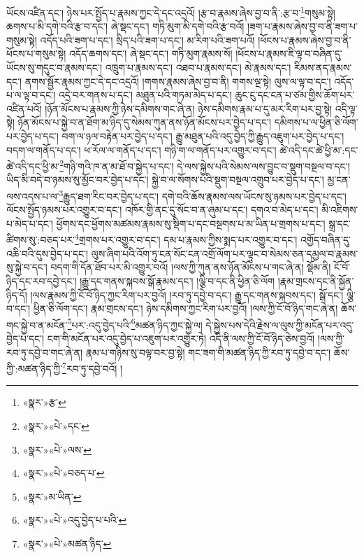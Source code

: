 ཡོངས་འཛིན་དང་། ཉེས་པར་སྤྱོད་པ་རྣམས་ཀྱང་དེ་དང་འདྲའོ། །རྩ་བ་རྣམས་ཞེས་བྱ་བ་ནི་:རྩ་བ་\footnote{«སྣར་»རྩ་}གསུམ་སྟེ། ཆགས་པ་མི་དགེ་བའི་རྩ་བ་དང་། ཞེ་སྡང་དང་། གཏི་མུག་མི་དགེ་བའི་རྩ་བའོ། །ཟག་པ་རྣམས་ཞེས་བྱ་བ་ནི་ཟག་པ་གསུམ་སྟེ། འདོད་པའི་ཟག་པ་དང་། སྲིད་པའི་ཟག་པ་དང་། མ་རིག་པའི་ཟག་པའོ། །ཕོངས་པ་རྣམས་ཞེས་བྱ་བ་ནི་ཕོངས་པ་གསུམ་སྟེ། འདོད་ཆགས་དང་། ཞེ་སྡང་དང་། གཏི་མུག་རྣམས་སོ། །ཕོངས་པ་རྣམས་ཇི་ལྟ་བ་བཞིན་དུ་ཡོངས་སུ་གདུང་བ་རྣམས་དང་། འཁྲུག་པ་རྣམས་དང་། འཐབ་པ་རྣམས་དང་། མེ་རྣམས་དང་། རིམས་ནད་རྣམས་དང་། ནགས་སྦྱོར་རྣམས་ཀྱང་དེ་དང་འདྲའོ། །གགས་རྣམས་ཞེས་བྱ་བ་ནི། གགས་ལྔ་སྟེ། ལུས་ལ་ལྟ་བ་དང་། འདོད་པ་ལ་ལྟ་བ་དང་། འདྲེ་བར་གནས་པ་དང་། མཐུན་པའི་གཏམ་མེད་པ་དང་། ཆུང་ངུ་དང་ངན་པ་ཙམ་གྱིས་ཆོག་པར་འཛིན་པའོ། །ཉོན་མོངས་པ་རྣམས་ཀྱི་ཉེས་དམིགས་གང་ཞེ་ན། ཉེས་དམིགས་རྣམ་པ་དུ་མར་རིག་པར་བྱ་སྟེ། འདི་ལྟ་སྟེ། ཉོན་མོངས་པ་སྐྱེ་བ་ན་ཐོག་མ་ཉིད་དུ་སེམས་ཀུན་ནས་ཉོན་མོངས་པར་བྱེད་པ་དང་། དམིགས་པ་ལ་ཕྱིན་ཅི་ལོག་པར་བྱེད་པ་དང་། བག་ལ་ཉལ་བརྟེན་པར་བྱེད་པ་དང་། རྒྱུ་མཐུན་པའི་འདུ་བྱེད་ཀྱི་རྒྱུད་འཇུག་པར་བྱེད་པ་དང་། བདག་ལ་གནོད་པ་དང་། ཕ་རོལ་ལ་གནོད་པ་དང་། གཉི་ག་ལ་གནོད་པར་འགྱུར་བ་དང་། ཚེ་འདི་དང་ཚེ་ཕྱི་མ་:དང་ཚེ་འདི་དང་ཕྱི་མ་\footnote{«སྣར་»«པེ་»དང་}གཉི་གའི་ཁ་ན་མ་ཐོ་བ་སྐྱེད་པ་དང་། དེ་ལས་སྐྱེས་པའི་སེམས་ལས་བྱུང་བ་སྡུག་བསྔལ་བ་དང་། ཡིད་མི་བདེ་བ་ཉམས་སུ་མྱོང་བར་བྱེད་པ་དང་། སྐྱེ་བ་ལ་སོགས་པའི་སྡུག་བསྔལ་འགྲུབ་པར་བྱེད་པ་དང་། མྱ་ངན་ལས་འདས་པ་ལ་\footnote{«སྣར་»«པེ་»ལས་}རྒྱུད་ཐག་རིང་བར་བྱེད་པ་དང་། དགེ་བའི་ཆོས་རྣམས་ལས་ཡོངས་སུ་ཉམས་པར་བྱེད་པ་དང་། ལོངས་སྤྱོད་ཉམས་པར་འགྱུར་བ་དང་། འཁོར་གྱི་ནང་དུ་སོང་བ་ན་ཞུམ་པ་དང་། དགའ་བ་མེད་པ་དང་། མི་འཇིགས་པ་མེད་པ་དང་། ཕྱོགས་དང་ཕྱོགས་མཚམས་རྣམས་སུ་སྡིག་པ་དང་བསྔགས་པ་མ་ཡིན་པ་གྲགས་པ་དང་། སྒྲ་དང་ཚིགས་སུ་:བཅད་པར་\footnote{«སྣར་»«པེ་»བཅད་པ་}གྲགས་པར་འགྱུར་བ་དང་། དམ་པ་རྣམས་ཀྱིས་སྨད་པར་འགྱུར་བ་དང་། འགྱོད་བཞིན་དུ་འཆི་བའི་དུས་བྱེད་པ་དང་། ལུས་ཞིག་པའི་འོག་ཏུ་ངན་སོང་ངན་འགྲོ་ལོག་པར་ལྟུང་བ་སེམས་ཅན་དམྱལ་བ་རྣམས་སུ་སྐྱེ་བ་དང་། བདག་གི་དོན་ཐོབ་པར་མི་འགྱུར་བའོ། །ལས་ཀྱི་ཀུན་ནས་ཉོན་མོངས་པ་གང་ཞེ་ན། སྡོམ་ནི། ངོ་བོ་ཉིད་དང་རབ་དབྱེ་དང་། །རྒྱུ་དང་གནས་སྐབས་སྒོ་རྣམས་དང་། །ལྕི་བ་དང་ནི་ཕྱིན་ཅི་ལོག །རྣམ་གྲངས་དང་ནི་སྐྱོན་ཉིད་དོ། །ལས་རྣམས་ཀྱི་ངོ་བོ་ཉིད་ཀྱང་རིག་པར་བྱའོ། །རབ་ཏུ་དབྱེ་བ་དང་། རྒྱུ་དང་གནས་སྐབས་དང་། སྒོ་དང་། ལྕི་བ་དང་། ཕྱིན་ཅི་ལོག་དང་། རྣམ་གྲངས་དང་། ཉེས་དམིགས་ཀྱང་རིག་པར་བྱའོ། །ལས་ཀྱི་ངོ་བོ་ཉིད་གང་ཞེ་ན། ཆོས་གང་སྐྱེ་བ་ན་མངོན་\footnote{«སྣར་»མ་ཡིན་}པར་:འདུ་བྱེད་པའི་\footnote{«སྣར་»«པེ་»འདུ་བྱེད་པ་པའི་}མཚན་ཉིད་ཀྱང་སྐྱེ་ལ། དེ་སྐྱེས་པས་དེའི་རྗེས་ལ་ལུས་ཀྱི་མངོན་པར་འདུ་བྱེད་པ་དང་། ངག་གི་མངོན་པར་འདུ་བྱེད་པ་འཇུག་པར་འགྱུར་ཏེ། འདི་ནི་ལས་ཀྱི་ངོ་བོ་ཉིད་ཅེས་བྱའོ། །ལས་ཀྱི་རབ་ཏུ་དབྱེ་བ་གང་ཞེ་ན། རྣམ་པ་གཉིས་སུ་བལྟ་བར་བྱ་སྟེ། གང་ཟག་གི་མཚན་ཉིད་ཀྱི་རབ་ཏུ་དབྱེ་བ་དང་། ཆོས་ཀྱི་:མཚན་ཉིད་ཀྱི་\footnote{«སྣར་»«པེ་»མཚན་ཉིད་}རབ་ཏུ་དབྱེ་བའོ། །
